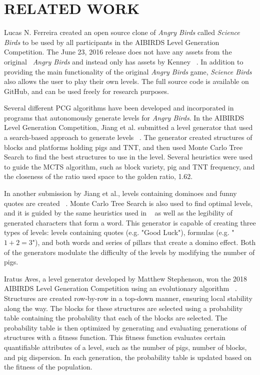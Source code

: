 \documentclass[letterpaper, 10 pt, conference]{ieeeconf}
\begin{document}
\section{RELATED WORK}

Lucas N. Ferreira created an open source clone of \textit{Angry Birds} called \textit{Science Birds} to be used by all participants in the AIBIRDS Level Generation Competition. The June 23, 2016 release does not have any assets from the original ~\textit{Angry Birds} and instead only has assets by Kenney ~\cite{kenney}. In addition to providing the main functionality of the original \textit{Angry Birds} game, \textit{Science Birds} also allows the user to play their own levels. The full source code is available on GitHub, and can be used freely for research purposes.
\par
Several different PCG algorithms have been developed and incorporated in programs that autonomously generate levels for \textit{Angry Birds}. In the AIBIRDS Level Generation Competition, Jiang et al. submitted a level generator that used a search-based approach to generate levels ~\cite{jiang2017mcts}. The generator created structures of blocks and platforms holding pigs and TNT, and then used Monte Carlo Tree Search to find the best structures to use in the level. Several heuristics were used to guide the MCTS algorithm, such as block variety, pig and TNT frequency, and the closeness of the ratio used space to the golden ratio, 1.62.
\par
In another submission by Jiang et al., levels containing dominoes and funny quotes are created ~\cite{jiang2017funny}. Monte Carlo Tree Search is also used to find optimal levels, and it is guided by the same heuristics used in ~\cite{jiang2017mcts} as well as the legibility of generated characters that form a word. This generator is capable of creating three types of levels: levels containing quotes (e.g. "Good Luck"), formulas (e.g. "$1 + 2 = 3$"), and both words and series of pillars that create a domino effect. Both of the generators modulate the difficulty of the levels by modifying the number of pigs.
\par
Iratus Aves, a level generator developed by Matthew Stephenson, won the 2018 AIBIRDS Level Generation Competition using an evolutionary algorithm ~\cite{renz2017generating}. Structures are created row-by-row in a top-down manner, ensuring local stability along the way. The blocks for these structures are selected using a probability table containing the probability that each of the blocks are selected. The probability table is then optimized by generating and evaluating generations of structures with a fitness function. This fitness function evaluates certain quantifiable attributes of a level, such as the number of pigs, number of blocks, and pig dispersion. In each generation, the probability table is updated based on the fitness of the population.
\end{document}
